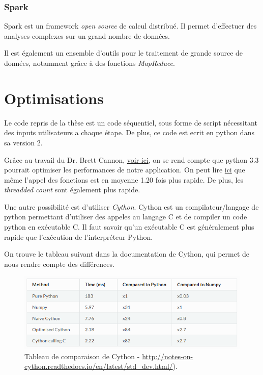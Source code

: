 \subsubsection{Spark}
Spark est un framework \emph{open source} de calcul distribué. Il permet d'effectuer des analyses complexes sur un grand nombre de données.

Il est également un ensemble d'outils pour le traitement de grande source de données, notamment grâce à des fonctions \emph{MapReduce}.
	
\section{Optimisations}
Le code repris de la thèse \thLeite est un code séquentiel, sous forme de script nécessitant des inputs utilisateurs a chaque étape. De plus, ce code est ecrit en python dans sa version 2.

Grâce au travail du Dr. Brett Cannon, \href{https://speakerdeck.com/pyconslides/python-3-dot-3-trust-me-its-better-than-python-2-dot-7-by-dr-brett-cannon}{voir ici}, on se rend compte que python 3.3 pourrait optimiser les performances de notre application. On peut lire  \href{https://mail.python.org/pipermail/python-dev/2012-October/121923.html}{ici} que même l'appel des fonctions est en moyenne 1.20 fois plus rapide. De plus, les \emph{threadded count} sont également plus rapide.

Une autre possibilité est d'utiliser \emph{Cython}. Cython est un compilateur/langage de python permettant d'utiliser des appeles au langage C et de compiler un code python en exécutable C. Il faut savoir qu'un exécutable C est généralement plus rapide que l'exécution de l'interpréteur Python. 

On trouve le tableau suivant dans la documentation de Cython, qui permet de nous rendre compte des différences.

\begin{figure}[H] 
\centering 
\includegraphics[width=1\columnwidth]{img/table_cython} 
\caption[Tableau performences Cython]{Tableau de comparaison de Cython - \url{http://notes-on-cython.readthedocs.io/en/latest/std_dev.html/}).}
\label{fig:galleria} 
\end{figure}

